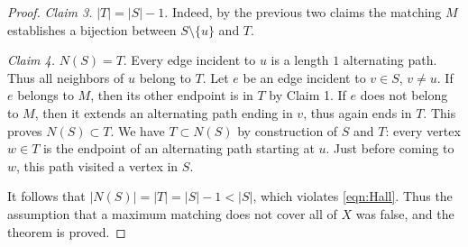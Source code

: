 \begin{proof}
\emph{Claim 3.} $|T| = |S| - 1$.
Indeed, by the previous two claims the matching $M$ establishes a bijection between $S \setminus \{u\}$ and $T$.

\emph{Claim 4.} $N(S) = T$.
Every edge incident to $u$ is a length $1$ alternating path.
Thus all neighbors of $u$ belong to $T$.
Let $e$ be an edge incident to $v \in S$, $v \ne u$.
If $e$ belongs to $M$, then its other endpoint is in $T$ by Claim 1.
If $e$ does not belong to $M$, then it extends an alternating path ending in $v$, thus again ends in $T$.
This proves $N(S) \subset T$.
We have $T \subset N(S)$ by construction of $S$ and $T$: every vertex $w \in T$ is the endpoint of an alternating path starting at $u$.
Just before coming to $w$, this path visited a vertex in $S$.

It follows that $|N(S)| = |T| = |S| - 1 < |S|$, which violates \eqref{eqn:Hall}.
Thus the assumption that a maximum matching does not cover all of $X$ was false, and the theorem is proved.
\end{proof}



